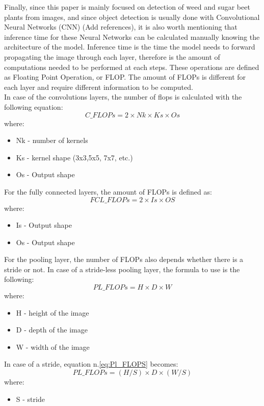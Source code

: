 Finally, since this paper is mainly focused on detection of weed and sugar beet plants from images, and since object detection is usually done with Convolutional Neural Networks (CNN) (Add references), it is also worth mentioning that inference time for these Neural Networks can be calculated manually knowing the architecture of the model. Inference time is the time the model needs to forward propagating the image through each layer, therefore is the amount of computations needed to be performed at each steps. These operations are defined as Floating Point Operation, or FLOP. The amount of FLOPs is different for each layer and require different information to be computed. \\
In case of the convolutions layers, the number of flops is calculated with the following equation:
\begin{equation}
C\_FLOPs = 2\times Nk \times Ks \times Os
\end{equation}
where:
\begin{itemize}
\item[] Nk - number of kernels
\item[] Ks - kernel shape (3x3,5x5, 7x7, etc.)
\item[] Os - Output shape
\end{itemize}
For the fully connected layers, the amount of FLOPs is defined as:
\begin{equation}
FCL\_FLOPs = 2\times Is \times OS
\end{equation}
where:
\begin{itemize}
\item[] Is - Output shape
\item[] Os - Output shape
\end{itemize}
For the pooling layer, the number of FLOPs also depends whether there is a stride or not. In case of a stride-less pooling layer, the formula to use is the following:
\begin{equation}
PL\_FLOPs = H \times D \times W
\label{eq:Pl_FLOPS}
\end{equation}
where:
\begin{itemize}
\item[] H - height of the image
\item[] D - depth of the image
\item[] W - width of the image
\end{itemize}
In case of a stride, equation n.\ref{eq:Pl_FLOPS} becomes:
\begin{equation}
PL\_FLOPs = (H/S) \times D \times (W/S)
\end{equation}
where:
\begin{itemize}
\item[] S - stride
\end{itemize}

